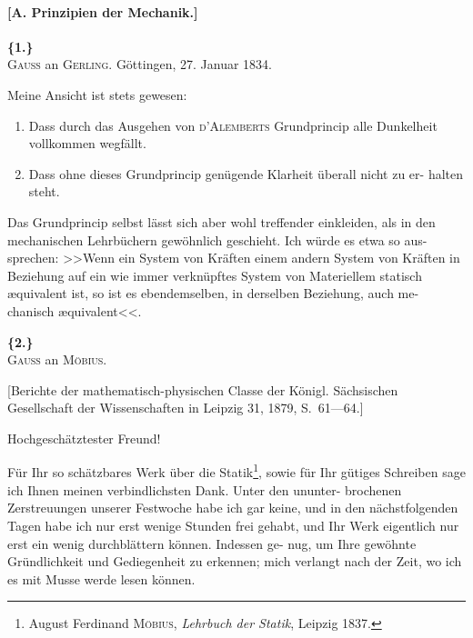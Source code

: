 \documentclass[12pt,a4paper]{article}
\theoremstyle{plain}
\theoremstyle{definition}
\theoremstyle{remark}
\begin{document}
\paragraph*{[A. Prinzipien der Mechanik.]}

\vspace{0.5cm}

\noindent\textbf{\{1.\}}\\
\textsc{Gauss} an \textsc{Gerling}. G\"ottingen, 27. Januar 1834.

\vspace{0.3cm}

Meine Ansicht ist stets gewesen:

\begin{enumerate}[label=\arabic*)]
\item Dass durch das Ausgehen von \textsc{d'Alemberts} Grundprincip alle Dunkelheit
vollkommen wegf\"allt.
\item Dass ohne dieses Grundprincip gen\"ugende Klarheit \"uberall nicht zu er-
halten steht.
\end{enumerate}

Das Grundprincip selbst l\"asst sich aber wohl treffender einkleiden, als in den
mechanischen Lehrb\"uchern gew\"ohnlich geschieht. Ich w\"urde es etwa so aus-
sprechen: >>Wenn ein System von Kr\"aften einem andern System von Kr\"aften
in Beziehung auf ein wie immer verkn\"upftes System von Materiellem statisch
\ae\-qui\-va\-lent ist, so ist es ebendemselben, in derselben Beziehung, auch me-
chanisch \ae\-qui\-va\-lent<<.

\vspace{0.5cm}

\noindent\textbf{\{2.\}}\\
\textsc{Gauss} an \textsc{M\"obius}.

\vspace{0.2cm}
{\small[Berichte der mathematisch-physischen Classe der K\"onigl. S\"achsischen Gesellschaft der Wissenschaften
in Leipzig 31, 1879, S.~61---64.]}

\vspace{0.3cm}

Hochgesch\"atztester Freund!

F\"ur Ihr so sch\"atzbares Werk \"uber die Statik\footnote{August Ferdinand \textsc{M\"obius}, 
\textit{Lehrbuch der Statik}, Leipzig 1837.}, sowie f\"ur Ihr g\"utiges
Schreiben sage ich Ihnen meinen verbindlichsten Dank. Unter den ununter-
brochenen Zerstreuungen unserer Festwoche habe ich gar keine, und in den
n\"achstfolgenden Tagen habe ich nur erst wenige Stunden frei gehabt, und
Ihr Werk eigentlich nur erst ein wenig durchbl\"attern k\"onnen. Indessen ge-
nug, um Ihre gew\"ohnte Gr\"undlichkeit und Gediegenheit zu erkennen; mich
verlangt nach der Zeit, wo ich es mit Musse werde lesen k\"onnen.
\end{document}
